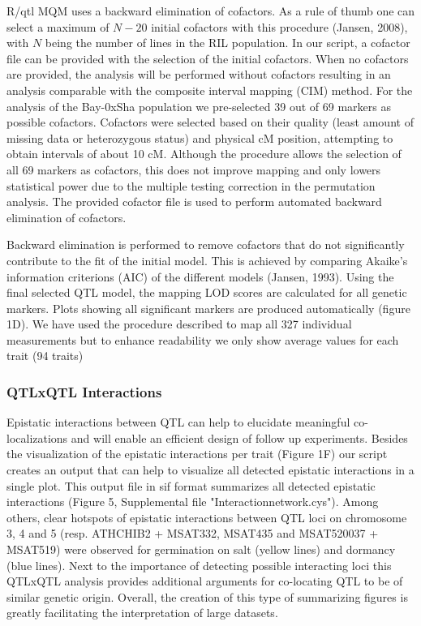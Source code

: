 R/qtl MQM uses a backward elimination of cofactors. As a rule of thumb one can select a maximum of 
$N-20$ initial cofactors with this procedure (Jansen, 2008), with $N$ being the number of lines in 
the RIL population. In our script, a cofactor file can be provided with the selection of the initial 
cofactors. When no cofactors are provided, the analysis will be performed without cofactors resulting 
in an analysis comparable with the composite interval mapping (CIM) method. For the analysis of the 
Bay-0xSha population we pre-selected 39 out of 69 markers as possible cofactors. Cofactors were selected 
based on their quality (least amount of missing data or heterozygous status) and physical cM position, 
attempting to obtain intervals of about 10 cM. Although the procedure allows the selection of all 69 
markers as cofactors, this does not improve mapping and only lowers statistical power due to the 
multiple testing correction in the permutation analysis. The provided cofactor file is used to perform 
automated backward elimination of cofactors.

Backward elimination is performed to remove cofactors that do not significantly contribute to the fit 
of the initial model. This is achieved by comparing Akaike's information criterions (AIC) of the 
different models (Jansen, 1993). Using the final selected QTL model, the mapping LOD scores are 
calculated for all genetic markers. Plots showing all significant markers are produced automatically 
(figure 1D). We have used the procedure described to map all 327 individual measurements but to enhance
readability we only show average values for each trait (94 traits)

\subsubsection{QTLxQTL Interactions}
Epistatic interactions between QTL can help to elucidate meaningful co-localizations and will enable an 
efficient design of follow up experiments. Besides the visualization of the epistatic interactions per 
trait (Figure 1F) our script creates an output that can help to visualize all detected epistatic 
interactions in a single plot. This output file in sif format summarizes all detected epistatic 
interactions (Figure 5, Supplemental file "Interactionnetwork.cys"). Among others, clear hotspots of 
epistatic interactions between QTL loci on chromosome 3, 4 and 5 (resp. ATHCHIB2 + MSAT332, MSAT435 and 
MSAT520037 + MSAT519) were observed for germination on salt (yellow lines) and dormancy (blue lines). 
Next to the importance of detecting possible interacting loci this QTLxQTL analysis provides additional 
arguments for co-locating QTL to be of similar genetic origin. Overall, the creation of this type of 
summarizing figures is greatly facilitating the interpretation of large datasets.


